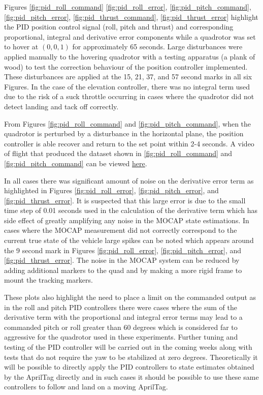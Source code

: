 \documentclass[11pt, twocolumn]{article}
\begin{document}
Figures \ref{fig:pid_roll_command} \ref{fig:pid_roll_error},	\ref{fig:pid_pitch_command}, \ref{fig:pid_pitch_error}, \ref{fig:pid_thrust_command}, \ref{fig:pid_thrust_error} highlight the PID position control signal (roll, pitch and thrust) and corresponding proportional, integral and derivative error components while a quadrotor was set to hover at $(0, 0, 1)$ for approximately 65 seconds. Large disturbances were applied manually to the hovering quadrotor with a testing apparatus (a plank of wood) to test the correction behaviour of the position controller implemented. These disturbances are applied at the 15, 21, 37, and 57 second marks in all six Figures. In the case of the elevation controller, there was no integral term used due to the risk of a suck throttle occurring in cases where the quadrotor did not detect landing and tack off correctly.

From Figures \ref{fig:pid_roll_command} and \ref{fig:pid_pitch_command}, when the quadrotor is perturbed by a disturbance in the horizontal plane, the position controller is able recover and return to the set point within 2-4 seconds. A video of flight that produced the dataset shown in \ref{fig:pid_roll_command} and \ref{fig:pid_pitch_command} can be viewed \href{https://www.youtube.com/watch?v=v1QDdZ0LdMc&index=17&list=PLk5z6lLnKFd6BD9EXWa09hqf6SNQhn59R}{here}.

In all cases there was significant amount of noise on the derivative error term as highlighted in Figures \ref{fig:pid_roll_error}, \ref{fig:pid_pitch_error}, and \ref{fig:pid_thrust_error}. It is suspected that this large error is due to the small time step of 0.01 seconds used in the calculation of the derivative term which has side effect of greatly amplifying any noise in the MOCAP state estimations. In cases where the MOCAP measurement did not correctly correspond to the current true state of the vehicle large spikes can be noted which appears around the 9 second mark in Figures \ref{fig:pid_roll_error}, \ref{fig:pid_pitch_error}, and \ref{fig:pid_thrust_error}. The noise in the MOCAP system can be reduced by adding additional markers to the quad and by making a more rigid frame to mount the tracking markers. 

These plots also highlight the need to place a limit on the commanded output as in the roll and pitch PID controllers there were cases where the sum of the derivative term with the proportional and integral error terms may lead to a commanded pitch or roll greater than 60 degrees which is considered far to aggressive for the quadrotor used in these experiments. Further tuning and testing of the PID controller will be carried out in the coming weeks along with tests that do not require the yaw to be stabilized at zero degrees. Theoretically it will be possible to directly apply the PID controllers to state estimates obtained by the AprilTag directly and in such cases it should be possible to use these same controllers to follow and land on a moving AprilTag. 
\end{document}

